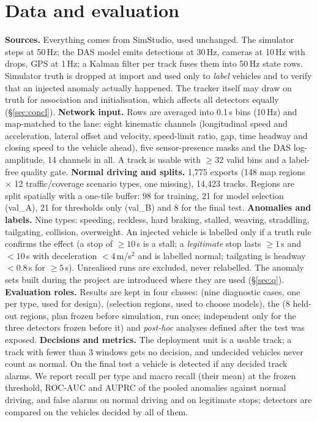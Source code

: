 \documentclass[10pt,a4paper,twocolumn]{article}
\begin{document}
\section{Data and evaluation}\label{sec:data}
\textbf{Sources.} Everything comes from SimStudio, used unchanged. The simulator steps at 50\,Hz; the DAS model emits detections at 30\,Hz, cameras at 10\,Hz with drops, GPS at 1\,Hz; a Kalman filter per track fuses them into 50\,Hz state rows. Simulator truth is dropped at import and used only to \emph{label} vehicles and to verify that an injected anomaly actually happened. The tracker itself may draw on truth for association and initialisation, which affects all detectors equally (\S\ref{sec:concl}).
\textbf{Network input.} Rows are averaged into 0.1\,s bins (10\,Hz) and map-matched to the lane: eight kinematic channels (longitudinal speed and acceleration, lateral offset and velocity, speed-limit ratio, gap, time headway and closing speed to the vehicle ahead), five sensor-presence masks and the DAS log-amplitude, 14 channels in all. A track is usable with $\ge32$ valid bins and a label-free quality gate.
\textbf{Normal driving and splits.} 1{,}775 exports (148 map regions $\times$ 12 traffic/coverage scenario types, one missing), 14{,}423 tracks. Regions are split spatially with a one-tile buffer: 98 for training, 21 for model selection (val\_A), 21 for thresholds only (val\_B) and 8 for the final test.
\textbf{Anomalies and labels.} Nine types: speeding, reckless, hard braking, stalled, weaving, straddling, tailgating, collision, overweight. An injected vehicle is labelled only if a truth rule confirms the effect (a stop of $\ge10$\,s is a stall; a \emph{legitimate} stop lasts $\ge1$\,s and $<10$\,s with deceleration $<4$\,m/s$^2$ and is labelled normal; tailgating is headway $<0.8$\,s for $\ge5$\,s). Unrealised runs are excluded, never relabelled. The anomaly sets built during the project are introduced where they are used (\S\ref{sec:q}).
\textbf{Evaluation roles.} Results are kept in four classes: \dev{} (nine diagnostic cases, one per type, used for design), \val{} (selection regions, used to choose models), the \ft{} (8 held-out regions, plan frozen before simulation, run once; independent only for the three detectors frozen before it) and \emph{post-hoc} analyses defined after the test was exposed.
\textbf{Decisions and metrics.} The deployment unit is a usable track; a track with fewer than 3 windows gets no decision, and undecided vehicles never count as normal. On the final test a vehicle is detected if any decided track alarms. We report recall per type and macro recall (their mean) at the frozen threshold, ROC-AUC and AUPRC of the pooled anomalies against normal driving, and false alarms on normal driving and on legitimate stops; detectors are compared on the vehicles decided by all of them.
\end{document}
